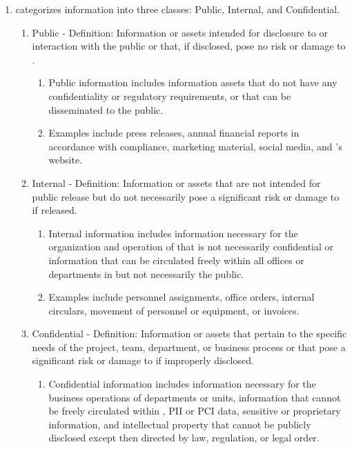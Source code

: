 \documentclass[../main.tex]{subfiles}
\begin{document}
\begin{enumerate}
    \item \CompanyName{} categorizes information into three classes: Public, Internal, and Confidential.
    \begin{enumerate}
        \item Public - Definition: Information or assets intended for disclosure to or interaction with the public or that, if disclosed, pose no risk or damage to \CompanyName.
        \begin{enumerate}
            \item Public information includes information assets that do not have any confidentiality or regulatory requirements, or that can be disseminated to the public.
            \item Examples include press releases, annual financial reports in accordance with compliance, marketing material, social media, and \CompanyName's website.
        \end{enumerate}
        \item Internal - Definition: Information or assets that are not intended for public release but do not necessarily pose a significant risk or damage to \CompanyName{} if released.
        \begin{enumerate}
            \item Internal information includes information necessary for the organization and operation of \CompanyName{} that is not necessarily confidential or information that can be circulated
            freely within all offices or departments in \CompanyName{} but not necessarily the public.
            \item Examples include personnel assignments, office orders, internal circulars, movement of personnel or equipment, or invoices.
        \end{enumerate}
        \item Confidential - Definition: Information or assets that pertain to the specific needs of the project, team, department, or business process or that pose a significant risk or
        damage to \CompanyName{} if improperly disclosed.
        \begin{enumerate}
            \item Confidential information includes information necessary for the business operations of departments or units, information that cannot be freely circulated within \CompanyName,
            PII or PCI data, sensitive or proprietary information, and intellectual property that cannot be publicly disclosed except then directed by law, regulation, or legal order.

\end{enumerate}
\end{enumerate}
\end{enumerate}
\end{document}
